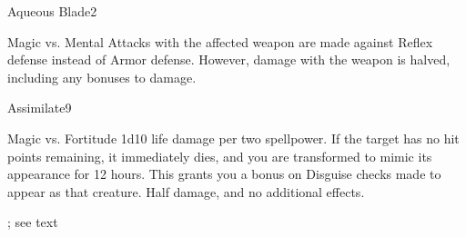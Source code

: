 \begin{spellsection}{Aqueous Blade}{2}
    \begin{spellheader}
    \end{spellheader}
    \begin{spellcontent}
        \begin{spelltargetinginfo}
        \end{spelltargetinginfo}
        \begin{spelleffects}
            \begin{spellattack}{Magic vs. Mental}
                \spellsuccess Attacks with the affected weapon are made against Reflex defense instead of Armor defense. However, damage with the weapon is halved, including any bonuses to damage.
            \end{spellattack}
            \spelldur \durshort
        \end{spelleffects}
    \end{spellcontent}
    \begin{spellfooter}
        \miscastrandom
    \end{spellfooter}
\end{spellsection}

\begin{spellsection}{Assimilate}{9}
    \begin{spellheader}
    \end{spellheader}
    \begin{spellcontent}
        \begin{spelltargetinginfo}
        \end{spelltargetinginfo}
        \begin{spelleffects}
            \begin{spellattack}{Magic vs. Fortitude}
                \spellsuccess 1d10 life damage per two spellpower. If the target has no hit points remaining, it immediately dies, and you are transformed to mimic its appearance for 12 hours. This grants you a  bonus on Disguise checks made to appear as that creature.
                \spellfailure Half damage, and no additional effects.
            \end{spellattack}
            \spelldur \durext; see text
        \end{spelleffects}
    \end{spellcontent}
    \begin{spellfooter}
        \miscastrandom
    \end{spellfooter}
\end{spellsection}

